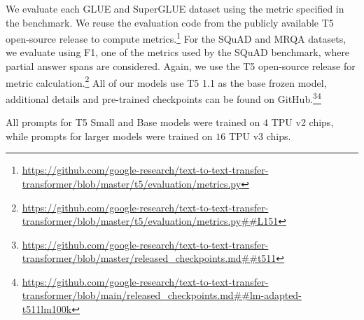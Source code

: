 \documentclass[11pt]{article}
\begin{document}
We evaluate each GLUE and SuperGLUE dataset using the metric specified in the benchmark. We reuse the evaluation code from the publicly available T5 open-source release to compute metrics.\footnote{\url{https://github.com/google-research/text-to-text-transfer-transformer/blob/master/t5/evaluation/metrics.py}} For the SQuAD and MRQA datasets, we evaluate using F1, one of the metrics used by the SQuAD benchmark, where partial answer spans are considered. Again, we use the T5 open-source release for metric calculation.\footnote{\url{https://github.com/google-research/text-to-text-transfer-transformer/blob/master/t5/evaluation/metrics.py##L151}} All of our models use T5 1.1 as the base frozen model, additional details and pre-trained checkpoints can be found on GitHub.\footnote{\url{https://github.com/google-research/text-to-text-transfer-transformer/blob/master/released_checkpoints.md##t511}}\footnote{\url{https://github.com/google-research/text-to-text-transfer-transformer/blob/main/released_checkpoints.md##lm-adapted-t511lm100k}}  

All prompts for T5 Small and Base models were trained on $4$ TPU v2 chips, while prompts for larger models were trained on $16$ TPU v3 chips.
\end{document}
